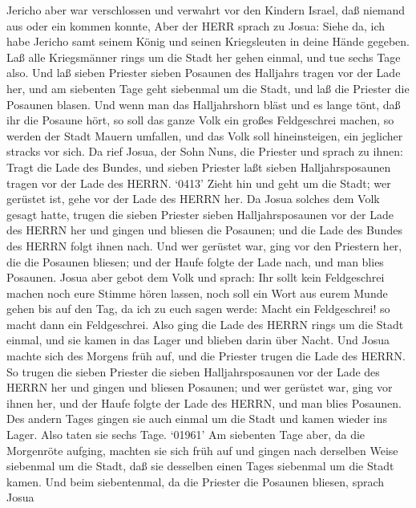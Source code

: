  Jericho aber war verschlossen und verwahrt vor den Kindern
Israel, daß niemand aus oder ein kommen konnte,  Aber der
HERR sprach zu Josua: Siehe da, ich habe Jericho samt seinem König und
seinen Kriegsleuten in deine Hände gegeben.  Laß alle
Kriegsmänner rings um die Stadt her gehen einmal, und tue sechs Tage
also.  Und laß sieben Priester sieben Posaunen des Halljahrs
tragen vor der Lade her, und am siebenten Tage geht siebenmal um die
Stadt, und laß die Priester die Posaunen blasen.  Und wenn
man das Halljahrshorn bläst und es lange tönt, daß ihr die Posaune hört,
so soll das ganze Volk ein großes Feldgeschrei machen, so werden der
Stadt Mauern umfallen, und das Volk soll hineinsteigen, ein jeglicher
stracks vor sich.  Da rief Josua, der Sohn Nuns, die
Priester und sprach zu ihnen: Tragt die Lade des Bundes, und sieben
Priester laßt sieben Halljahrsposaunen tragen vor der Lade des HERRN.
 `0413' Zieht hin und geht um die Stadt; wer gerüstet ist,
gehe vor der Lade des HERRN her.  Da Josua solches dem Volk
gesagt hatte, trugen die sieben Priester sieben Halljahrsposaunen vor
der Lade des HERRN her und gingen und bliesen die Posaunen; und die Lade
des Bundes des HERRN folgt ihnen nach.  Und wer gerüstet
war, ging vor den Priestern her, die die Posaunen bliesen; und der Haufe
folgte der Lade nach, und man blies Posaunen.  Josua aber
gebot dem Volk und sprach: Ihr sollt kein Feldgeschrei machen noch eure
Stimme hören lassen, noch soll ein Wort aus eurem Munde gehen bis auf
den Tag, da ich zu euch sagen werde: Macht ein Feldgeschrei! so macht
dann ein Feldgeschrei.  Also ging die Lade des HERRN rings
um die Stadt einmal, und sie kamen in das Lager und blieben darin über
Nacht.  Und Josua machte sich des Morgens früh auf, und die
Priester trugen die Lade des HERRN.  So trugen die sieben
Priester die sieben Halljahrsposaunen vor der Lade des HERRN her und
gingen und bliesen Posaunen; und wer gerüstet war, ging vor ihnen her,
und der Haufe folgte der Lade des HERRN, und man blies Posaunen.
 Des andern Tages gingen sie auch einmal um die Stadt und
kamen wieder ins Lager. Also taten sie sechs Tage.  `01961'
Am siebenten Tage aber, da die Morgenröte aufging, machten sie sich früh
auf und gingen nach derselben Weise siebenmal um die Stadt, daß sie
desselben einen Tages siebenmal um die Stadt kamen.  Und
beim siebentenmal, da die Priester die Posaunen bliesen, sprach Josua
